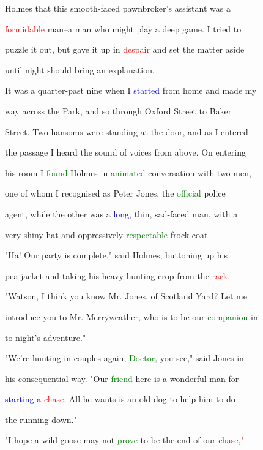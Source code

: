  Holmes that this smooth-faced pawnbroker's assistant was a

 \textcolor{red}{formidable} man--a man who might play a deep game. I tried to

 puzzle it out, but gave it up in \textcolor{red}{despair} and set the matter aside

 until night should bring an explanation.



 It was a quarter-past nine when I \textcolor{blue}{started} from home and made my

 way across the Park, and so through Oxford Street to Baker

 Street. Two hansoms were standing at the door, and as I entered

 the passage I heard the sound of voices from above. On entering

 his room I \textcolor{green}{found} Holmes in \textcolor{green}{animated} conversation with two men,

 one of whom I recognised as Peter Jones, the \textcolor{green}{official} \textcolor{BurntOrange}{police}

 agent, while the other was a \textcolor{blue}{long,} thin, sad-faced man, with a

 very shiny hat and oppressively \textcolor{green}{respectable} frock-coat.



 "Ha! Our party is complete," said Holmes, buttoning up his

 pea-jacket and taking his heavy hunting crop from the \textcolor{red}{rack.}

 "Watson, I think you know Mr. Jones, of Scotland Yard? Let me

 introduce you to Mr. Merryweather, who is to be our \textcolor{green}{companion} in

 to-night's \textcolor{BurntOrange}{adventure."}



 "We're hunting in couples again, \textcolor{green}{Doctor,} you see," said Jones in

 his consequential way. "Our \textcolor{green}{friend} here is a \textcolor{BurntOrange}{wonderful} man for

 \textcolor{blue}{starting} a \textcolor{red}{chase.} All he wants is an old dog to help him to do

 the running down."



 "I \textcolor{BurntOrange}{hope} a \textcolor{BurntOrange}{wild} goose may not \textcolor{green}{prove} to be the end of our \textcolor{red}{chase,"}

